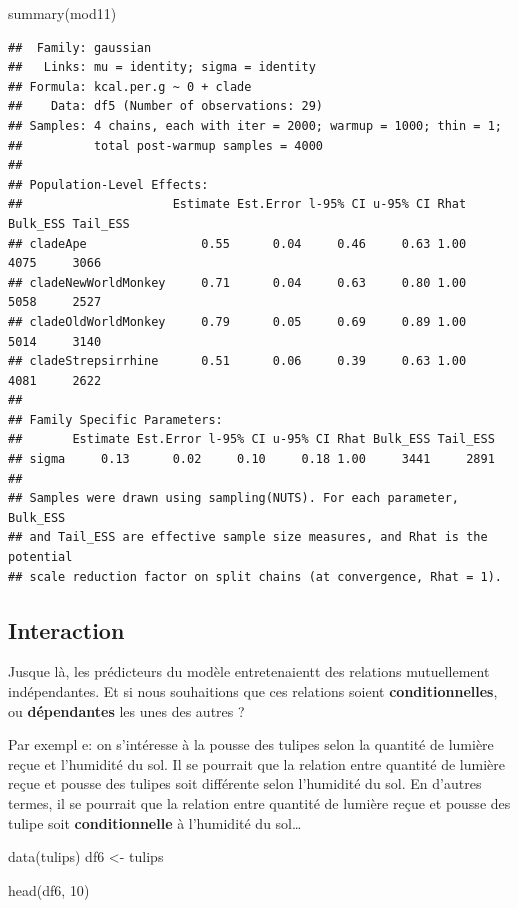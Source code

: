 \documentclass[
  a4paper,11pt,twoside,onecolumn,openright,final,oldfontcommands]{memoir}
\newenvironment{Shaded}{\begin{snugshade}}{\end{snugshade}}
\newcommand{\DecValTok}[1]{\textcolor[rgb]{0.00,0.00,0.81}{#1}}
\newcommand{\FunctionTok}[1]{\textcolor[rgb]{0.00,0.00,0.00}{#1}}
\newcommand{\NormalTok}[1]{#1}
\newcommand{\OtherTok}[1]{\textcolor[rgb]{0.56,0.35,0.01}{#1}}
\theoremstyle{definition}
\theoremstyle{definition}
\theoremstyle{definition}
\theoremstyle{remark}
\begin{document}
\begin{Shaded}
\begin{Highlighting}[]
\FunctionTok{summary}\NormalTok{(mod11)}
\end{Highlighting}
\end{Shaded}

\begin{verbatim}
##  Family: gaussian 
##   Links: mu = identity; sigma = identity 
## Formula: kcal.per.g ~ 0 + clade 
##    Data: df5 (Number of observations: 29) 
## Samples: 4 chains, each with iter = 2000; warmup = 1000; thin = 1;
##          total post-warmup samples = 4000
## 
## Population-Level Effects: 
##                     Estimate Est.Error l-95% CI u-95% CI Rhat Bulk_ESS Tail_ESS
## cladeApe                0.55      0.04     0.46     0.63 1.00     4075     3066
## cladeNewWorldMonkey     0.71      0.04     0.63     0.80 1.00     5058     2527
## cladeOldWorldMonkey     0.79      0.05     0.69     0.89 1.00     5014     3140
## cladeStrepsirrhine      0.51      0.06     0.39     0.63 1.00     4081     2622
## 
## Family Specific Parameters: 
##       Estimate Est.Error l-95% CI u-95% CI Rhat Bulk_ESS Tail_ESS
## sigma     0.13      0.02     0.10     0.18 1.00     3441     2891
## 
## Samples were drawn using sampling(NUTS). For each parameter, Bulk_ESS
## and Tail_ESS are effective sample size measures, and Rhat is the potential
## scale reduction factor on split chains (at convergence, Rhat = 1).
\end{verbatim}

\hypertarget{interaction}{%
\subsection{Interaction}\label{interaction}}

Jusque là, les prédicteurs du modèle entretenaientt des relations mutuellement indépendantes. Et si nous souhaitions que ces relations soient \textbf{conditionnelles}, ou \textbf{dépendantes} les unes des autres ?

Par exempl e: on s'intéresse à la pousse des tulipes selon la quantité de lumière reçue et l'humidité du sol. Il se pourrait que la relation entre quantité de lumière reçue et pousse des tulipes soit différente selon l'humidité du sol. En d'autres termes, il se pourrait que la relation entre quantité de lumière reçue et pousse des tulipe soit \textbf{conditionnelle} à l'humidité du sol\ldots{}

\begin{Shaded}
\begin{Highlighting}[]
\FunctionTok{data}\NormalTok{(tulips)}
\NormalTok{df6 }\OtherTok{\textless{}{-}}\NormalTok{ tulips}

\FunctionTok{head}\NormalTok{(df6, }\DecValTok{10}\NormalTok{)}
\end{Highlighting}
\end{Shaded}
\end{document}
